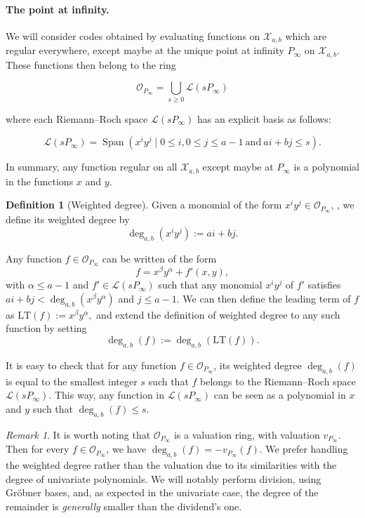 \documentclass[a4paper]{article}
\theoremstyle{definition}
\newtheorem{definition}[thm]{Definition}
\theoremstyle{remark}
\newtheorem{remark}{Remark}
\newcommand{\calL}{\mathcal{L}}
\newcommand{\calO}{\mathcal{O}}
\newcommand{\calX}{\mathcal{X}}
\newcommand{\Span}[1]{\operatorname{Span}\left(#1\right)}
\newcommand{\degab}[1]{\deg_{a,b}\left(#1\right)}
\begin{document}

\paragraph{The point at infinity.} We will consider codes obtained by evaluating functions on $\calX_{a,b}$ which are regular everywhere, except maybe at the unique point at infinity $P_\infty$ on $\calX_{a,b}$. These functions then belong to the ring 

\begin{equation}\label{eq:O_Pinf}
\mathcal{O}_{P_\infty}=\bigcup_{s \geq 0} \calL(s P_\infty)
\end{equation}

where each Riemann--Roch space $\calL(s P_\infty)$ has an explicit basis as follows:

\begin{equation} \label{eq:basis_L(sP_inf)}
    \calL(sP_{\infty}) = \Span{x^iy^j \mid 0 \leq i, 0\leq j\leq a-1 \ \mathrm{and} \ ai+bj \leq s}.
\end{equation}

In summary, any function regular on all $\calX_{a,b}$ except maybe at $P_\infty$ is a polynomial in the functions $x$ and $y$. 

\begin{definition}[Weighted degree]
Given a monomial of the form $x^iy^j \in \calO_{P_\infty}$, , we define its weighted degree by
\[ \degab{x^iy^j} := ai+bj.\]

Any function $f \in \calO_{P_\infty}$ can be written of the form $$f = x^{\beta}y^{\alpha} + f'(x,y),$$
with $\alpha \leq a-1$ and $f' \in \calL(sP_{\infty})$ such that any monomial $x^iy^j$ of $f'$ satisfies $ai+bj < \degab{x^{\beta}y^{\alpha}}$ and $j \leq a-1$. We can then define the leading term of $f$ as $\mathrm{LT}(f) := x^{\beta}y^{\alpha},$ and extend the definition of weighted degree to any such function by setting 
\[\degab{f} := \degab{\mathrm{LT}(f)}.\]
\end{definition}

It is easy to check that for any function $f \in \calO_{P_\infty}$, its weighted degree $\degab{f}$ is equal to the smallest integer $s$ such that $f$ belongs to the Riemann--Roch space $\calL(sP_{\infty})$.
%
This way, any function in $\calL(sP_\infty)$ can be seen as a polynomial in $x$ and $y$ such that $\degab{f}\leq s$. 

\begin{remark}
It is worth noting that $\calO_{P_\infty}$ is a valuation ring, with valuation $v_{P_\infty}$. Then for every $f \in \calO_{P_\infty}$, we have $
\degab{f}=-v_{P_\infty}(f)$. We prefer handling the weighted degree rather than the valuation due to its similarities with the degree of univariate 
polynomials. We will notably perform division, using Gr\"obner bases, and, as expected in the univariate case, the degree of the remainder is 
\textit{generally} smaller than the dividend's one.
\end{remark}
\end{document}
